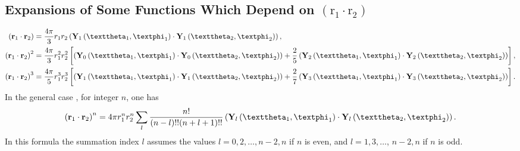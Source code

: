 \subsection{Expansions of Some Functions Which Depend on $\left(\mathrm{r}_{1} \cdot \mathrm{r}_{2}\right)$}\label{sec:5.17.3}
\begin{align}
\left(\vect{r}_{1} \cdot \vect{r}_{2}\right) & =\frac{4 \pi}{3} r_{1} r_{2}\left(\vect{Y}_{1}\left(\vartheta_{1}, \varphi_{1}\right) \cdot \vect{Y}_{1}\left(\vartheta_{2}, \varphi_{2}\right)\right) , \label{eq:5:17:10}\\
\left(\vect{r}_{1} \cdot \vect{r}_{2}\right)^{2} & =\frac{4 \pi}{3} r_{1}^{2} r_{2}^{2}\left[\left(\vect{Y}_{0}\left(\vartheta_{1}, \varphi_{1}\right) \cdot \vect{Y}_{0}\left(\vartheta_{2}, \varphi_{2}\right)\right)+\frac{2}{5}\left(\vect{Y}_{2}\left(\vartheta_{1}, \varphi_{1}\right) \cdot \vect{Y}_{2}\left(\vartheta_{2}, \varphi_{2}\right)\right)\right],  \label{eq:5:17:11}\\
\left(\vect{r}_{1} \cdot \vect{r}_{2}\right)^{3} & =\frac{4 \pi}{5} r_{1}^{3} r_{2}^{3}\left[\left(\vect{Y}_{1}\left(\vartheta_{1}, \varphi_{1}\right) \cdot \vect{Y}_{1}\left(\vartheta_{2}, \varphi_{2}\right)\right)+\frac{2}{7}\left(\vect{Y}_{3}\left(\vartheta_{1}, \varphi_{1}\right) \cdot \vect{Y}_{3}\left(\vartheta_{2}, \varphi_{2}\right)\right)\right]. \label{eq:5:17:12}
\end{align}
In the general case \cite{ref069}, for integer $n$, one has
\begin{equation}
\left(\vect{r}_{1} \cdot \vect{r}_{2}\right)^{n}=4 \pi r_{1}^{n} r_{2}^{n} \sum_{l} \frac{n!}{(n-l)!!(n+l+1)!!}\left(\vect{Y}_{l}\left(\vartheta_{1}, \varphi_{1}\right) \cdot \vect{Y}_{l}\left(\vartheta_{2}, \varphi_{2}\right)\right) . \label{eq:5:17:13}
\end{equation}
In this formula the summation index $l$ assumes the values $l=0,2, \ldots, n-2, n$ if $n$ is even, and $l=1,3, \ldots$, $n-2, n$ if $n$ is odd.

